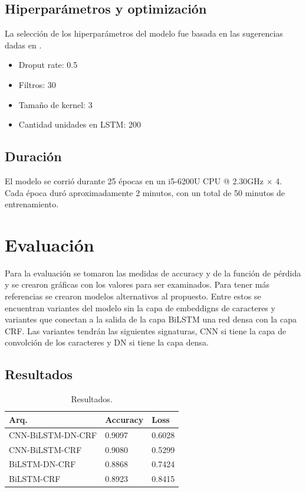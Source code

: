 \documentclass[runningheads]{llncs}
\begin{document}
\subsection{Hiperparámetros y optimización}

La selección de los hiperparámetros del modelo fue basada en las sugerencias dadas en
\cite{paper}.

\begin{itemize}
	\item Droput rate: 0.5
	\item Filtros: 30
	\item Tamaño de kernel: 3
	\item Cantidad unidades en LSTM: 200  
\end{itemize}

\subsection{Duración}

El modelo se corrió durante 25 épocas en un i5-6200U CPU @ 2.30GHz × 4. Cada época
duró aproximadamente 2 minutos, con un total de 50 minutos de entrenamiento.

\section{Evaluación}

Para la evaluación se tomaron las medidas de accuracy y de la función de pérdida y se
crearon gráficas con los valores para ser examinados. Para tener más referencias se
crearon modelos alternativos al propuesto. Entre estos se encuentran variantes del
modelo sin la capa de embeddigns de caracteres y variantes que conectan a la salida
de la capa BiLSTM una red densa con la capa CRF. Las variantes tendrán las siguientes
signaturas, CNN si tiene la capa de convolción de los caracteres y DN si tiene la capa
densa.

\subsection{Resultados}

\begin{table}
	\caption{Resultados.}\label{results}
	\begin{tabular}{|l|l|l|}
	\hline
		Arq. &  Accuracy & Loss \\
	\hline
		CNN-BiLSTM-DN-CRF & 0.9097 & 0.6028 \\
		CNN-BiLSTM-CRF 	  & 0.9080 & 0.5299 \\
		BiLSTM-DN-CRF 	  & 0.8868 & 0.7424 \\
		BiLSTM-CRF 		  & 0.8923 & 0.8415 \\
	\hline
	\end{tabular}
\end{table}
\end{document}
